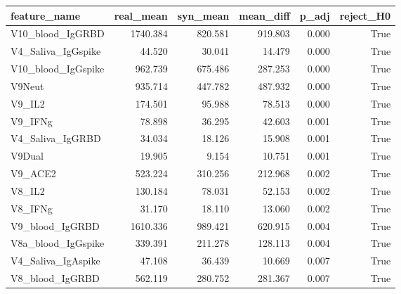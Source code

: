 \begin{tabular}{lrrrrr}
\toprule
feature\_name & real\_mean & syn\_mean & mean\_diff & p\_adj & reject\_H0 \\
\midrule
V10\_blood\_IgGRBD & 1740.384 & 820.581 & 919.803 & 0.000 & True \\
V4\_Saliva\_IgGspike & 44.520 & 30.041 & 14.479 & 0.000 & True \\
V10\_blood\_IgGspike & 962.739 & 675.486 & 287.253 & 0.000 & True \\
V9Neut & 935.714 & 447.782 & 487.932 & 0.000 & True \\
V9\_IL2 & 174.501 & 95.988 & 78.513 & 0.000 & True \\
V9\_IFNg & 78.898 & 36.295 & 42.603 & 0.001 & True \\
V4\_Saliva\_IgGRBD & 34.034 & 18.126 & 15.908 & 0.001 & True \\
V9Dual & 19.905 & 9.154 & 10.751 & 0.001 & True \\
V9\_ACE2 & 523.224 & 310.256 & 212.968 & 0.002 & True \\
V8\_IL2 & 130.184 & 78.031 & 52.153 & 0.002 & True \\
V8\_IFNg & 31.170 & 18.110 & 13.060 & 0.002 & True \\
V9\_blood\_IgGRBD & 1610.336 & 989.421 & 620.915 & 0.004 & True \\
V8a\_blood\_IgGspike & 339.391 & 211.278 & 128.113 & 0.004 & True \\
V4\_Saliva\_IgAspike & 47.108 & 36.439 & 10.669 & 0.007 & True \\
V8\_blood\_IgGRBD & 562.119 & 280.752 & 281.367 & 0.007 & True \\
\bottomrule
\end{tabular}
